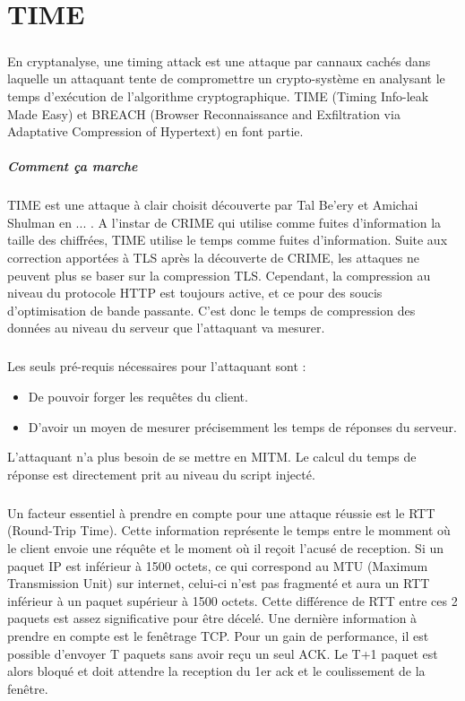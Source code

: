 \chapter{TIME}
\label{chapter:time}

\paragraph{}
En cryptanalyse, une timing attack est une attaque par cannaux cachés dans laquelle un attaquant tente de compromettre un crypto-système en analysant le temps d'exécution de l'algorithme cryptographique. TIME (Timing Info-leak Made Easy) et BREACH (Browser Reconnaissance and Exfiltration via Adaptative Compression of Hypertext) en font partie.

\paragraph{Comment ça marche}
TIME est une attaque à clair choisit découverte par Tal Be'ery et Amichai Shulman en ... . A l'instar de CRIME qui utilise comme fuites d'information la taille des chiffrées, TIME utilise le temps comme fuites d'information.
Suite aux correction apportées à TLS après la découverte de CRIME, les attaques ne peuvent plus se baser sur la compression TLS. Cependant, la compression au niveau du protocole HTTP est toujours active, et ce pour des soucis d'optimisation de bande passante. C'est donc le temps de compression des données au niveau du serveur que l'attaquant va mesurer.

\paragraph{}
Les seuls pré-requis nécessaires pour l'attaquant sont :
\begin{itemize}
  \item De pouvoir forger les requêtes du client.
  \item D'avoir un moyen de mesurer précisemment les temps de réponses du serveur.
\end{itemize}
L'attaquant n'a plus besoin de se mettre en MITM. Le calcul du temps de réponse est directement prit au niveau du script injecté.

\paragraph{}
Un facteur essentiel à prendre en compte pour une attaque réussie est le RTT (Round-Trip Time). Cette information représente le temps entre le momment où le client envoie une réquête et le moment où il reçoit l'acusé de reception. Si un paquet IP est inférieur à 1500 octets, ce qui correspond au MTU (Maximum Transmission Unit) sur internet, celui-ci n'est pas fragmenté et aura un RTT inférieur à un paquet supérieur à 1500 octets. Cette différence de RTT entre ces 2 paquets est assez significative pour être décelé. Une dernière information à prendre en compte est le fenêtrage TCP. Pour un gain de performance, il est possible d'envoyer T paquets sans avoir reçu un seul ACK. Le T+1 paquet est alors bloqué et doit attendre la reception du 1er ack et le coulissement de la fenêtre.\\


